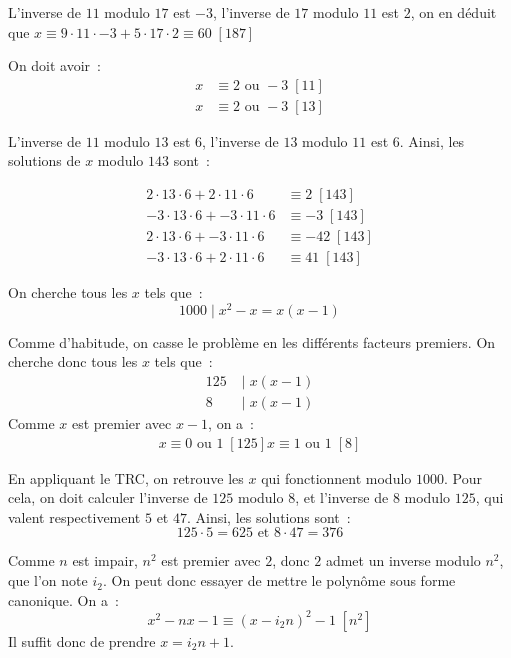 \begin{sol}
L'inverse de $11$ modulo $17$ est $-3$, l'inverse de $17$ modulo $11$ est $2$, on en déduit que $x \equiv 9 \cdot 11 \cdot -3 + 5 \cdot 17 \cdot 2 \equiv 60 \; [187]$
\end{sol}

\begin{sol}
On doit avoir~:
\begin{align*}
x &\equiv 2 \mbox{ ou } -3 \; [11] \\
x &\equiv 2 \mbox{ ou } -3 \; [13]
\end{align*}

L'inverse de $11$ modulo $13$ est $6$, l'inverse de $13$ modulo $11$ est $6$. Ainsi, les solutions de $x$ modulo $143$ sont~:

\begin{align*}
2 \cdot 13 \cdot 6 + 2 \cdot 11 \cdot 6 &\equiv 2 \; [143] \\
-3 \cdot 13 \cdot 6 + -3 \cdot 11 \cdot 6 &\equiv -3 \; [143] \\
2 \cdot 13 \cdot 6 + -3 \cdot 11 \cdot 6 &\equiv -42 \; [143] \\
-3 \cdot 13 \cdot 6 + 2 \cdot 11 \cdot 6 &\equiv 41 \; [143]
\end{align*}
\end{sol}

\begin{sol}
On cherche tous les $x$ tels que~:
$$1000 \;|\; x^2 - x = x(x - 1)$$

Comme d'habitude, on casse le problème en les différents facteurs premiers.
On cherche donc tous les $x$ tels que~:
\begin{align*}
125 &\;|\; x(x - 1) \\
8 &\;|\; x(x - 1)
\end{align*}
Comme $x$ est premier avec $x - 1$, on a~:
\begin{align*}
x \equiv 0 \mbox{ ou } 1 \; [125]
x \equiv 1 \mbox{ ou } 1 \; [8]
\end{align*}

En appliquant le TRC, on retrouve les $x$ qui fonctionnent modulo $1000$.
Pour cela, on doit calculer l'inverse de $125$ modulo $8$, et l'inverse de $8$ modulo $125$, qui valent respectivement $5$ et $47$.
Ainsi, les solutions sont~:
$$125 \cdot 5 = 625 \mbox{ et } 8 \cdot 47 = 376$$
\end{sol}

\begin{sol}
Comme $n$ est impair, $n^2$ est premier avec $2$, donc $2$ admet un inverse modulo $n^2$, que l'on note $i_2$. On peut donc essayer de mettre le polynôme sous forme canonique.
On a~:
$$x^2 - nx - 1 \equiv (x - i_2 n)^2 - 1 \; [n^2]$$
Il suffit donc de prendre $x = i_2 n + 1$.
\end{sol}

